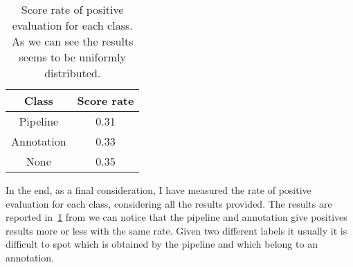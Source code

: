 \documentclass{standalone}
\begin{document}
	\begin{table}[h!]
		\centering
		\begin{tabular}{|c|c|}
			\hline
			Class 		& Score rate \\ \hline
			Pipeline 	& 0.31		 \\ \hline
			Annotation  & 0.33		 \\ \hline
			None 		& 0.35		 \\ \hline
		\end{tabular}
	\caption{Score rate of positive evaluation for each class. As we can see the results seems to be uniformly distributed.}\label{tab:Rate}
	\end{table}
	
	In the end, as a final consideration, I have measured the rate of positive evaluation for each class, considering all the results provided. The results are reported in \tablename\,\ref{tab:Rate} from we can notice that the pipeline and annotation give positives results more or less with the same rate. Given two different labels it usually it is difficult to spot which is obtained by the pipeline and which belong to an annotation.
	
\end{document}
